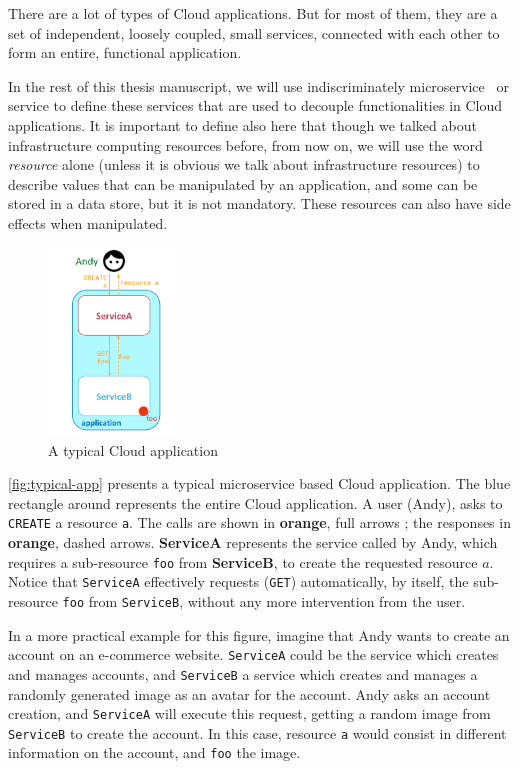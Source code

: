 There are a lot of types of Cloud applications. But for most of them,
they are a set of independent, \gls{loosely coupled}, small \glspl{service},
connected with each other to form an entire, functional application.

In the rest of this thesis manuscript, we will use indiscriminately
\gls{microservice}~\cite{Tho15} or service to define these services
that are used to decouple functionalities in Cloud applications.
%
It is important to define also here that though we talked about
infrastructure computing resources before, from now on, we will use
the word \emph{resource} alone (unless it is obvious we talk about
infrastructure resources) to describe values that can be manipulated
by an application, and some can be stored in a data store, but it is
not mandatory. These resources can also have side effects when
manipulated.


\begin{figure}[htbp]
  \centering
  \includegraphics[width=0.3\textwidth]{figs/pdf/application}
  \caption{A typical Cloud application}
  \label{fig:typical-app}
\end{figure}

\autoref{fig:typical-app} presents a typical \gls{microservice} based Cloud
application.
%
The blue rectangle around represents the entire Cloud application.
%
A user (Andy), asks to \verb|CREATE| a resource \verb|a|.
%
The calls are shown in \textbf{{\color{CbOrange}orange}}, full arrows
; the responses in \textbf{{\color{CbOrange}orange}}, dashed
arrows.
%
\textbf{{\color{CbRose}ServiceA}} represents the service called by
Andy, which requires a sub-resource \verb|foo| from
\textbf{{\color{CbCyan}ServiceB}}, to create the requested resource
$a$.
%
Notice that \verb|ServiceA| effectively requests (\verb|GET|)
automatically, by itself, the sub-resource \verb|foo| from
\verb|ServiceB|, without any more intervention from the user.

In a more practical example for this figure, imagine that Andy wants
to create an account on an e-commerce website.
%
\verb|ServiceA| could be the service which creates and manages
accounts, and \verb|ServiceB| a service which creates and manages a
randomly generated image as an avatar for the account.
%
Andy asks an account creation, and \verb|ServiceA| will execute this request,
getting a random image from \verb|ServiceB| to create the account.
%
In this case, resource \verb|a| would consist in different information on
the account, and \verb|foo| the image.



